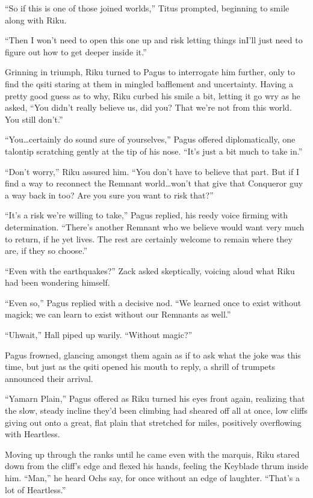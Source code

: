 ``So if this is one of those joined worlds,'' Titus prompted, beginning to smile along with Riku.

``Then I won't need to open this one up and risk letting things in\textemdash I'll just need to figure out how to get deeper inside it.''

Grinning in triumph, Riku turned to Pagus to interrogate him further, only to find the qsiti staring at them in mingled bafflement and uncertainty. Having a pretty good guess as to why, Riku curbed his smile a bit, letting it go wry as he asked, ``You didn't really believe us, did you? That we're not from this world. You still don't.''

``You\ldots certainly do sound sure of yourselves,'' Pagus offered diplomatically, one talontip scratching gently at the tip of his nose. ``It's just a bit much to take in.''

``Don't worry,'' Riku assured him. ``You don't have to believe that part. But if I find a way to reconnect the Remnant world\ldots won't that give that Conqueror guy a way back in too? Are you sure you want to risk that?''

``It's a risk we're willing to take,'' Pagus replied, his reedy voice firming with determination. ``There's another Remnant who we believe would want very much to return, if he yet lives. The rest are certainly welcome to remain where they are, if they so choose.''

``Even with the earthquakes?'' Zack asked skeptically, voicing aloud what Riku had been wondering himself.

``Even so,'' Pagus replied with a decisive nod. ``We learned once to exist without magick; we can learn to exist without our Remnants as well.''

``Uh\textemdash wait,'' Hall piped up warily. ``Without magic?''

Pagus frowned, glancing amongst them again as if to ask what the joke was this time, but just as the qsiti opened his mouth to reply, a shrill of trumpets announced their arrival.

``Yamarn Plain,'' Pagus offered as Riku turned his eyes front again, realizing that the slow, steady incline they'd been climbing had sheared off all at once, low cliffs giving out onto a great, flat plain that stretched for miles, positively overflowing with Heartless.

Moving up through the ranks until he came even with the marquis, Riku stared down from the cliff's edge and flexed his hands, feeling the Keyblade thrum inside him. ``Man,'' he heard Ochs say, for once without an edge of laughter. ``That's a lot of Heartless.''

